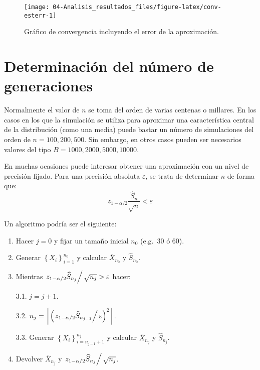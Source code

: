\documentclass[
]{book}
\theoremstyle{break}
\theoremstyle{definition}
\theoremstyle{definition}
\theoremstyle{definition}
\theoremstyle{remark}
\begin{document}
\begin{figure}[!htb]

{\centering \texttt{[image: 04-Analisis\_resultados\_files/figure-latex/conv-esterr-1]} 

}

\caption{Gráfico de convergencia incluyendo el error de la aproximación.}\label{fig:conv-esterr}
\end{figure}

\hypertarget{determinaciuxf3n-del-nuxfamero-de-generaciones}{%
\section{Determinación del número de generaciones}\label{determinaciuxf3n-del-nuxfamero-de-generaciones}}

Normalmente el valor de \(n\) se toma del orden de varias centenas o millares.
En los casos en los que la simulación se utiliza para aproximar una característica central de la distribución (como una media) puede bastar un número de simulaciones del orden de \(n = 100, 200, 500\).
Sin embargo, en otros casos pueden ser necesarios valores del tipo \(B = 1000, 2000, 5000, 10000\).

En muchas ocasiones puede interesar obtener una aproximación con un nivel de precisión fijado.
Para una precisión absoluta \(\varepsilon\), se trata de determinar
\(n\) de forma que:
\[z_{1-\alpha /2}\dfrac{\widehat{S}_{n}}{\sqrt{n}}<\varepsilon\]

Un algoritmo podría ser el siguiente:

\begin{enumerate}
\def\labelenumi{\arabic{enumi}.}
\item
  Hacer \(j=0\)
  y fijar un tamaño inicial \(n_{0}\) (e.g.~30 ó 60).
\item
  Generar \(\left\{ X_{i}\right\} _{i=1}^{n_{0}}\)
  y calcular \(\overline{X}_{n_0}\) y \(\widehat{S}_{n_{0}}\).
\item
  Mientras \(\left. z_{1-\alpha /2}\widehat{S}_{n_j}\right/ \sqrt{n_{j}}>\varepsilon\) hacer:

  3.1. \(j=j+1\).

  3.2. \(n_{j}=\left\lceil \left( \left. z_{1-\alpha /2}\widehat{S}  _{n_{j-1}}\right/ \varepsilon \right)^{2}\right\rceil\).

  3.3. Generar \(\left\{ X_{i}\right\}_{i=n_{j-1}+1}^{n_j}\)
  y calcular \(\overline{X}_{n_j}\) y \(\widehat{S}_{n_j}\).
\item
  Devolver \(\overline{X}_{n_j}\) y \(\left. z_{1-\alpha /2}\widehat{S}_{n_j}\right/ \sqrt{n_{j}}\).
\end{enumerate}
\end{document}
